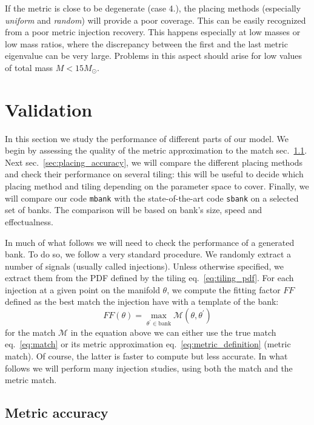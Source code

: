 \documentclass[twocolumn,showpacs,preprintnumbers,nofootinbib,prd,
superscriptaddress,10pt]{revtex4-2}
\begin{document}
If the metric is close to be degenerate (case 4.), the placing methods (especially {\it uniform} and {\it random}) will provide a poor coverage. This can be easily recognized from a poor metric injection recovery. This happens especially at low masses or low mass ratios, where the discrepancy between the first and the last metric eigenvalue can be very large. Problems in this aspect should arise for low values of total mass $M<15 M_{\odot}$.

\section{Validation} \label{sec:validation}

In this section we study the performance of different parts of our model. We begin by assessing the quality of the metric approximation to the match sec.~\ref{sec:metric_accuracy}.
Next sec.~\ref{sec:placing_accuracy}, we will compare the different placing methods and check their performance on several tiling: this will be useful to decide which placing method and tiling depending on the parameter space to cover.
Finally, we will compare our code \texttt{mbank} with the state-of-the-art code \texttt{sbank} \cite{sbank} on a selected set of banks. The comparison will be based on bank's size, speed and effectualness.

In much of what follows we will need to check the performance of a generated bank. To do so, we follow a very standard procedure. We randomly extract a number of signals (usually called injections). Unless otherwise specified, we extract them from the PDF defined by the tiling eq.~\eqref{eq:tiling_pdf}.
For each injection at a given point on the manifold $\theta$, we compute the fitting factor $FF$ defined as the best match the injection have with a template of the bank:
\begin{equation}\label{eq:FF}
	FF(\theta) = \max_{\theta^\prime \in \text{bank}} \mathcal{M}(\theta, \theta^\prime)
\end{equation}
for the match $\mathcal{M}$ in the equation above we can either use the true match eq.~\eqref{eq:match} or its metric approximation eq.~\eqref{eq:metric_definition} (metric match).
Of course, the latter is faster to compute but less accurate. In what follows we will perform many injection studies, using both the match and the metric match.

\subsection{Metric accuracy} \label{sec:metric_accuracy}
\end{document}
